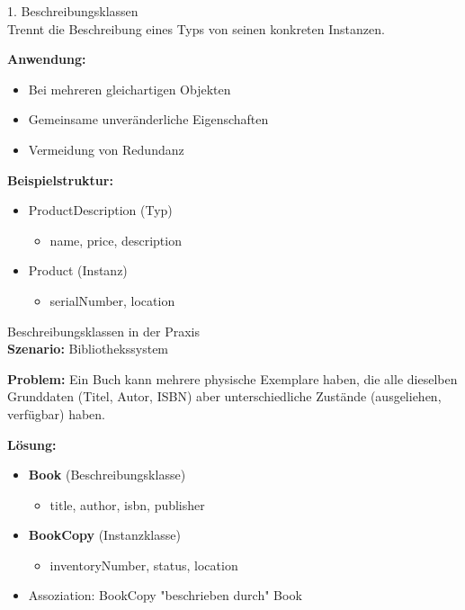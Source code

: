 \begin{concept}{1. Beschreibungsklassen}\\
Trennt die Beschreibung eines Typs von seinen konkreten Instanzen.

\textbf{Anwendung:}
\begin{itemize}
    \item Bei mehreren gleichartigen Objekten
    \item Gemeinsame unveränderliche Eigenschaften
    \item Vermeidung von Redundanz
\end{itemize}

\textbf{Beispielstruktur:}
\begin{itemize}
    \item ProductDescription (Typ)
    \begin{itemize}
        \item name, price, description
    \end{itemize}
    \item Product (Instanz)
    \begin{itemize}
        \item serialNumber, location
    \end{itemize}
\end{itemize}
\end{concept}

\begin{example2}{Beschreibungsklassen in der Praxis}\\
\textbf{Szenario:} Bibliothekssystem

\textbf{Problem:} 
Ein Buch kann mehrere physische Exemplare haben, die alle dieselben Grunddaten (Titel, Autor, ISBN) aber unterschiedliche Zustände (ausgeliehen, verfügbar) haben.

\textbf{Lösung:}
\begin{itemize}
    \item \textbf{Book} (Beschreibungsklasse)
    \begin{itemize}
        \item title, author, isbn, publisher
    \end{itemize}
    \item \textbf{BookCopy} (Instanzklasse)
    \begin{itemize}
        \item inventoryNumber, status, location
    \end{itemize}
    \item Assoziation: BookCopy "beschrieben durch" Book
\end{itemize}
\end{example2}

